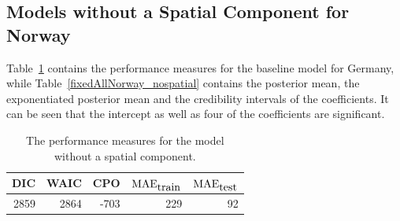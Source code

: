 \subsection{Models without a Spatial Component for Norway}\label{sec:nospatial_norway}
Table~\ref{allNorway_nospatial} contains the performance measures for the baseline model for Germany, while Table~\ref{fixedAllNorway_nospatial} contains the posterior mean, the exponentiated posterior mean and the credibility intervals of the coefficients. It can be seen that the intercept as well as four of the coefficients are significant.
\begin{table}[H] 
\caption{The performance measures for the model without a spatial component. \label{allNorway_nospatial}}
\begin{tabular}{r r r r r}
\toprule\textbf{DIC}	& \textbf{WAIC} & \textbf{CPO} & \textbf{$\hbox{MAE}_{\hbox{train}}$} & \textbf{$\hbox{MAE}_{\hbox{test}}$}\\
\midrule
2859 & 2864 & -703 & 229 & 92 \\
\bottomrule
\end{tabular}
\end{table} 
